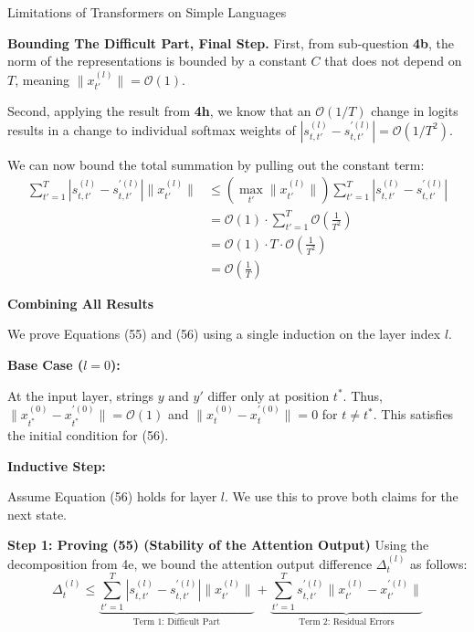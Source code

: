 \begin{question}{Limitations of Transformers on Simple Languages}
\begin{subquestion}{\textbf{Bounding The Difficult Part, Final Step.}}
    First, from sub-question \textbf{4b}, the norm of the representations is bounded by a constant $C$ that does not depend on $T$, meaning $\|x_{t'}^{(l)}\| = \mathcal{O}(1)$. 

    Second, applying the result from \textbf{4h}, we know that an $\mathcal{O}(1/T)$ change in logits results in a change to individual softmax weights of $|s_{t,t'}^{(l)} - s_{t,t'}^{\prime(l)}| = \mathcal{O}(1/T^2)$.

    We can now bound the total summation by pulling out the constant term:
    \begin{align*}
    \sum_{t'=1}^{T} |s_{t,t'}^{(l)} - s_{t,t'}^{\prime(l)}| \|x_{t'}^{(l)}\| &\le \left( \max_{t'} \|x_{t'}^{(l)}\| \right) \sum_{t'=1}^{T} |s_{t,t'}^{(l)} - s_{t,t'}^{\prime(l)}| \\
    &= \mathcal{O}(1) \cdot \sum_{t'=1}^{T} \mathcal{O}\left(\frac{1}{T^2}\right) \\
    &= \mathcal{O}(1) \cdot T \cdot \mathcal{O}\left(\frac{1}{T^2}\right) \\
    &= \mathcal{O}\left(\frac{1}{T}\right)
    \end{align*}
\end{subquestion}

\begin{subquestion}{\textbf{Combining All Results}}

We prove Equations (55) and (56) using a single induction on the layer index $l$.

\textbf{Base Case ($l=0$):}

At the input layer, strings $y$ and $y'$ differ only at position $t^*$. Thus, $\|x_{t^*}^{(0)} - x_{t^*}^{\prime(0)}\| = \mathcal{O}(1)$ and $\|x_t^{(0)} - x_t^{\prime(0)}\| = 0$ for $t \neq t^*$. This satisfies the initial condition for (56).

\textbf{Inductive Step:}

Assume Equation (56) holds for layer $l$. We use this to prove both claims for the next state.

\textbf{Step 1: Proving (55) (Stability of the Attention Output)}
Using the decomposition from 4e, we bound the attention output difference $\Delta_t^{(l)}$ as follows:
\begin{equation}
\Delta_t^{(l)} \le \underbrace{\sum_{t'=1}^{T} |s_{t,t'}^{(l)} - s_{t,t'}^{\prime(l)}| \|x_{t'}^{(l)}\|}_{\text{Term 1: Difficult Part}} + \underbrace{\sum_{t'=1}^{T} s_{t,t'}^{\prime(l)} \|x_{t'}^{(l)} - x_{t'}^{\prime(l)}\|}_{\text{Term 2: Residual Errors}}
\end{equation}


\end{subquestion}
\end{question}
